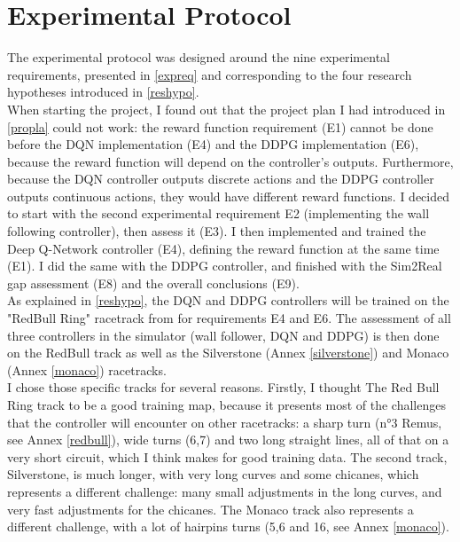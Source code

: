 
\chapter{Experimental Protocol} %

\label{Chapter6} %




The experimental protocol was designed around the nine experimental requirements, presented in \ref{expreq} and corresponding to the four research hypotheses introduced in \ref{reshypo}. \\
When starting the project, I found out that the project plan I had introduced in \ref{propla} could not work: the reward function requirement (E1) cannot be done before the DQN implementation (E4) and the DDPG implementation (E6), because the reward function will depend on the controller's outputs. Furthermore, because the DQN controller outputs discrete actions and the DDPG controller outputs continuous actions, they would have different reward functions. I decided to start with the second experimental requirement E2 (implementing the wall following controller), then assess it (E3). I then implemented and trained the Deep Q-Network controller (E4), defining the reward function at the same time (E1). I did the same with the DDPG controller, and finished with the Sim2Real gap assessment (E8) and the overall conclusions (E9). \\
As explained in \ref{reshypo}, the DQN and DDPG controllers will be trained on the "RedBull Ring" racetrack from \cite{bosello} for requirements E4 and E6. The assessment of all three controllers in the simulator (wall follower, DQN and DDPG) is then done on the RedBull track as well as the Silverstone (Annex \ref{silverstone}) and Monaco (Annex \ref{monaco}) racetracks. \\
I chose those specific tracks for several reasons. Firstly, I thought The Red Bull Ring track to be a good training map, because it presents most of the challenges that the controller will encounter on other racetracks: a sharp turn (n°3 Remus, see Annex \ref{redbull}), wide turns (6,7) and two long straight lines, all of that on a very short circuit, which I think makes for good training data. The second track, Silverstone, is much longer, with very long curves and some chicanes, which represents a different challenge: many small adjustments in the long curves, and very fast adjustments for the chicanes. The Monaco track also represents a different challenge, with a lot of hairpins turns (5,6 and 16, see Annex \ref{monaco}). \\
